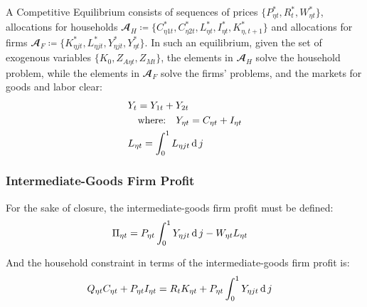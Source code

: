 \documentclass[../thesis.tex]{subfiles}
\begin{document}
	A Competitive Equilibrium consists of sequences of prices $\{P_{\eta t}^{\ast}, R_t^{\ast}, W_{\eta t}^{\ast}\}$, allocations for households $\mathbfscr{A}_H \coloneq \{C_{\eta 1 t}^{\ast}, C_{\eta 2 t}^{\ast}, L_{\eta t}^{\ast}, I_{\eta t}^{\ast}, K_{\eta, t+1}^{\ast}\}$ and allocations  for firms $\mathbfscr{A}_F \coloneq \{K_{\eta jt}^{\ast}, L_{\eta jt}^{\ast}, Y_{\eta jt}^{\ast}, Y_{\eta t}^{\ast}\}$. In such an equilibrium, given the set of exogenous variables $\{K_0, Z_{A\eta t}, Z_{Mt}\}$, the elements in $\mathbfscr{A}_H$ solve the household problem, while the elements in $\mathbfscr{A}_F$ solve the firms' problems, and the markets for goods and labor clear: %
	\begin{align}
		& Y_{t} = Y_{1 t} + Y_{2 t} \label{eq_v2:reg-market-clearing-condition-Yt} \\
		& \quad \text{where:} \quad Y_{\eta t} = C_{\eta t} + I_{\eta t} \label{eq_v2:reg-regional-demand} \\
		& L_{\eta t} = \int_{0}^{1} L_{\eta jt} \operatorname{d} j \label{eq_v2:reg-market-clearing-condition-Lt} 
	\end{align}
	

\subsubsection*{Intermediate-Goods Firm Profit}

For the sake of closure, the intermediate-goods firm profit must be defined:
\begin{align}
	\Pi_{\eta t} &= P_{\eta t} \int_{0}^{1} Y_{\eta jt} \operatorname{d} j - W_{\eta t} L_{\eta t} \label{eq_v2:reg-int-good-firm-profit-total-2}
\end{align}

And the household constraint in terms of the intermediate-goods firm profit is:
\begin{align}
	& Q_{\eta t} C_{\eta t} + P_{\eta t} I_{\eta t} = R_{t} K_{\eta t} + P_{\eta t} \int_{0}^{1} Y_{\eta jt} \operatorname{d} j \label{eq_v2:reg-budget-constraint-3}
\end{align}
 

\begin{comment}

\begin{align}
	& \text{where:} \quad Y_{\eta t} = C_{\eta 1 t} + C_{\eta 2 t} + I_{\eta t} %
	L_{\eta t} &= \int_{0}^{1} L_{\eta jt} \dif j %
\end{align}

\end{comment}
\end{document}
